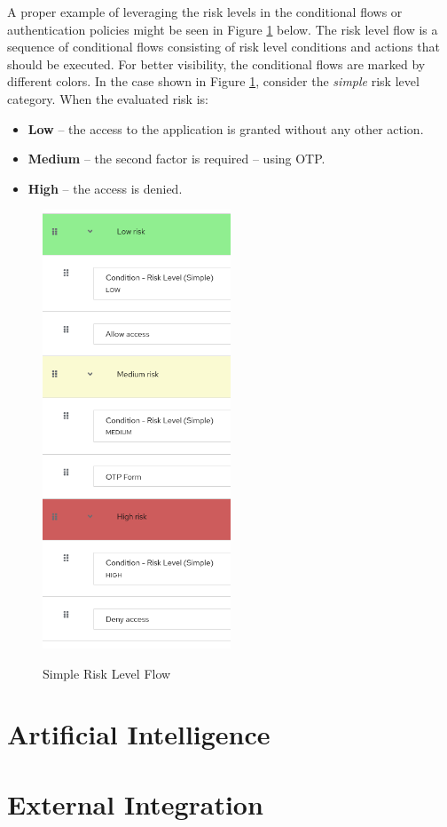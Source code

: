 A proper example of leveraging the risk levels in the conditional flows or authentication policies might be seen in Figure \ref{fig:risk-levels-example} below.
The risk level flow is a sequence of conditional flows consisting of risk level conditions and actions that should be executed.
For better visibility, the conditional flows are marked by different colors.
\newline
\newline
In the case shown in Figure \ref{fig:risk-levels-example}, consider the \textit{simple} risk level category. When the evaluated risk is:
\begin{itemize}
    \item \textbf{Low} -- the access to the application is granted without any other action.
    \item \textbf{Medium} -- the second factor is required -- using OTP.
    \item \textbf{High} -- the access is denied.
\end{itemize}

\begin{figure}[htbp]
  \centering
  \includegraphics[width=0.5\textwidth]{img/sections/5-design/simple-risk-level-flow.png}
  \label{fig:risk-levels-example}
  \caption{Simple Risk Level Flow}
\end{figure}


\newpage
\section{Artificial Intelligence}

\newpage
\section{External Integration}